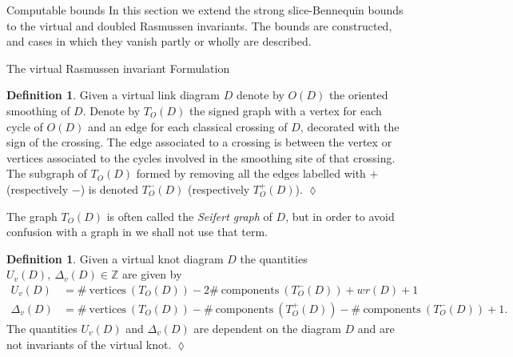 \documentclass[10pt,oneside]{amsart}
\theoremstyle{definition}
\newtheorem{definition}[theorem]{Definition}
\numberwithin{equation}{section}
\DeclareRobustCommand{\CloseDef}{	\leavevmode\unskip\penalty9999 \hbox{}\nobreak\hfill
	\quad\hbox{$\lozenge$}}
\begin{document}
{	\z@{-1.2\linespacing\@plus-.5\linespacing}{.8\linespacing}	{\normalfont\bfseries\Large}}{Computable bounds}\label{Sec:bounds}
In this section we extend the strong slice-Bennequin bounds to the virtual and doubled Rasmussen invariants. The bounds are constructed, and cases in which they vanish partly or wholly are described.

{		{\normalfont\bfseries\large}}{The virtual Rasmussen invariant}\label{Sec:dkkformulation}
{		{\normalfont\bfseries}}{Formulation}
\begin{definition}
	\label{Seifertgraph}
	Given a virtual link diagram \( D \) denote by \( O ( D ) \) the oriented smoothing of \( D \). Denote by \( T_O ( D ) \) the signed graph with a vertex for each cycle of \( O ( D ) \) and an edge for each classical crossing of \( D \), decorated with the sign of the crossing. The edge associated to a crossing is between the vertex or vertices associated to the cycles involved in the smoothing site of that crossing. The subgraph of \( T_O ( D ) \) formed by removing all the edges labelled with \( + \) (respectively \( - \)) is denoted \( T^{-}_O ( D ) \) (respectively \( T^{+}_O ( D )\)).\CloseDef
\end{definition}

The graph \( T_O ( D ) \) is often called the \emph{Seifert graph} of \( D \), but in order to avoid confusion with a graph in  we shall not use that term.

\begin{definition}
	\label{Def:u}
	Given a virtual knot diagram \( D \) the quantities \( U_v ( D ),~ \Delta_v ( D ) \in \mathbb{Z} \) are given by
	\begin{equation*}
	\begin{aligned}
	U_v ( D ) &= \# ~\text{vertices}~ ( T_O ( D ) ) - 2 \# ~\text{components}~ ( T^{-}_O ( D ) ) + wr ( D ) + 1 \\
	\Delta_v ( D ) &= \# ~\text{vertices}~ ( T_O ( D ) ) - \# ~\text{components}~ ( T^{+}_O ( D ) ) - \# ~\text{components}~ ( T^{-}_O ( D ) ) + 1.
	\end{aligned}
	\end{equation*}
	The quantities \( U_v ( D ) \) and \( \Delta_v ( D ) \) are dependent on the diagram \( D \) and are not invariants of the virtual knot.\CloseDef
\end{definition}
\end{document}

